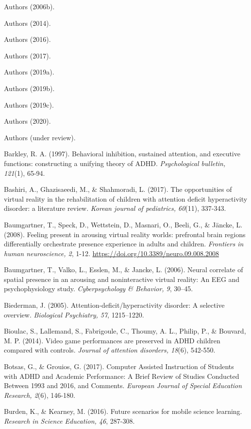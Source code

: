 \documentclass[11.5pt]{sig-alternate} %
\begin{document}
Authors (2006b). 

Authors (2014). 

Authors (2016).

Authors (2017). 

Authors (2019a). 

Authors (2019b).  

Authors (2019c). 

Authors (2020). 

Authors (under review). 

Barkley, R. A. (1997). Behavioral inhibition, sustained attention, and executive functions: constructing a unifying theory of ADHD. \textit{Psychological bulletin, 121}(1), 65-94.

Bashiri, A., Ghazisaeedi, M., \& Shahmoradi, L. (2017). The opportunities of virtual reality in the rehabilitation of children with attention deficit hyperactivity disorder: a literature review. \textit{Korean journal of pediatrics, 60}(11), 337-343.

Baumgartner, T., Speck, D., Wettstein, D., Masnari, O., Beeli, G., \& Jäncke, L. (2008). Feeling present in arousing virtual reality worlds: prefrontal brain regions differentially orchestrate presence experience in adults and children. \textit{Frontiers in human neuroscience, 2}, 1-12. \url{https://doi.org/10.3389/neuro.09.008.2008}

Baumgartner, T., Valko, L., Esslen, M., \& Jancke, L. (2006). Neural correlate of spatial presence in an arousing and noninteractive virtual reality: An EEG and psychophysiology study.\textit{ Cyberpsychology \& Behavior, 9}, 30–45.

Biederman, J. (2005). Attention-deficit/hyperactivity disorder: A selective overview. \textit{Biological Psychiatry, 57}, 1215–1220.

Bioulac, S., Lallemand, S., Fabrigoule, C., Thoumy, A. L., Philip, P., \& Bouvard, M. P. (2014). Video game performances are preserved in ADHD children compared with controls. \textit{Journal of attention disorders, 18}(6), 542-550.

Botsas, G., \& Grouios, G. (2017). Computer Assisted Instruction of Students with ADHD and Academic Performance: A Brief Review of Studies Conducted Between 1993 and 2016, and Comments. \textit{European Journal of Special Education Research, 2}(6), 146-180.

Burden, K., \& Kearney, M. (2016). Future scenarios for mobile science learning. \textit{Research in Science Education, 46}, 287-308.
\end{document}
